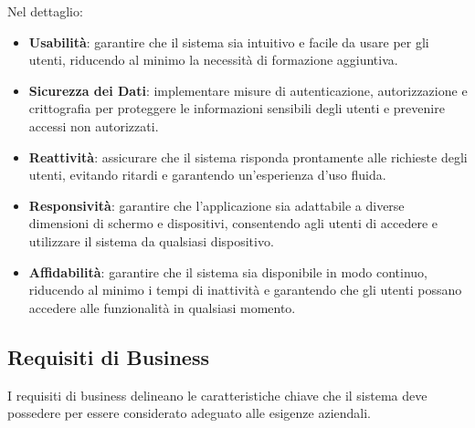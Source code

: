 Nel dettaglio:
\begin{itemize}
    \item \textbf{Usabilità}: garantire che il sistema sia intuitivo e facile da usare per gli utenti, riducendo al minimo la necessità di formazione aggiuntiva.
    \item \textbf{Sicurezza dei Dati}: implementare misure di autenticazione, autorizzazione e crittografia per proteggere le informazioni sensibili degli utenti e prevenire accessi non autorizzati.
    \item \textbf{Reattività}: assicurare che il sistema risponda prontamente alle richieste degli utenti, evitando ritardi e garantendo un'esperienza d'uso fluida.
    \item \textbf{Responsività}: garantire che l'applicazione sia adattabile a diverse dimensioni di schermo e dispositivi, consentendo agli utenti di accedere e utilizzare il sistema da qualsiasi dispositivo.
    \item \textbf{Affidabilità}: garantire che il sistema sia disponibile in modo continuo, riducendo al minimo i tempi di inattività e garantendo che gli utenti possano accedere alle funzionalità in qualsiasi momento.
\end{itemize}

\subsection{Requisiti di Business}

I requisiti di business delineano le caratteristiche chiave che il sistema deve possedere
per essere considerato adeguato alle esigenze aziendali.

